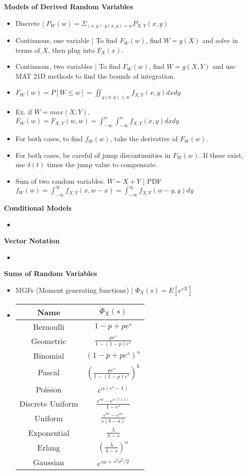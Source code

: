 \documentclass[8pt]{article}
\begin{document}
\textbf{Models of Derived Random Variables}
\begin{itemize}
    \item Discrete | $P_W(w) = \Sigma_{(x, y): g(x,y) = w} P_{X,Y}(x, y)$
    \item Continuous, one variable | To find $F_W(w)$, find $W = g(X)$ and solve in terms of $X$, then plug into $F_X(x)$.
    \item Continuous, two variables | To find $F_W(w)$, find $W = g(X, Y)$ and use MAT 21D methods to find the bounds of integration.
    \item $F_W(w) = P[W \leq w] = \iint_{g(x,y) \leq w} f_{X,Y}(x, y) dx dy$
    \item Ex. if $W = max(X, Y)$, $F_W(w) = F_{X,Y}(w, w) = \int_{-\infty}^w \int_{-\infty}^w f_{X,Y}(x, y) dx dy$
    \item For both cases, to find $f_W(w)$, take the derivative of $F_W(w)$.
    \item For both cases, be careful of jump discontinuities in $F_W(w)$. If these exist, use $\delta(t)$ times the jump value to compensate.
    \item Sum of two random variables: $W = X + Y$ | PDF $f_W(w) = \int_{-\infty}^\infty f_{X,Y}(x, w - x) = \int_{-\infty}^\infty f_{X,Y}(w - y, y) dy$
\end{itemize}
\textbf{Conditional Models}
\begin{itemize}
    \item
\end{itemize}
\textbf{Vector Notation}
\begin{itemize}
    \item
\end{itemize}
\textbf{Sums of Random Variables}
\begin{itemize}
    \item MGFs (Moment generating functions) | $\Phi_X(s) = E[e^{sX}]$
    \item
    \begin{tabular}{|c|c|}
        \hline
        Name & $\Phi_X(s)$ \\
        \hline
        Bernoulli & $1 - p + pe^s$ \\
        Geometric & $\frac{pe^s}{1 - (1 - p)e^s}$ \\
        Binomial & $(1 - p + pe^s)^n$  \\
        Pascal & $(\frac{pe^s}{1 - (1 - p)e^s})^k$ \\
        Poisson & $e^{\alpha(e^s - 1)}$ \\
        Discrete Uniform & $\frac{e^{sk} - e^{s(l + 1)}}{1 - e^s}$ \\
        Uniform & $\frac{e^{bs} - e^{as}}{s(b - a)}$ \\
        Exponential & $\frac{\lambda}{\lambda - s}$ \\
        Erlang & $\left(\frac{\lambda}{\lambda - s}\right)^n$ \\
        Gaussian & $e^{s\mu + s^2\sigma^2/2}$ \\
        \hline
    \end{tabular}
\end{itemize}
\end{document}
